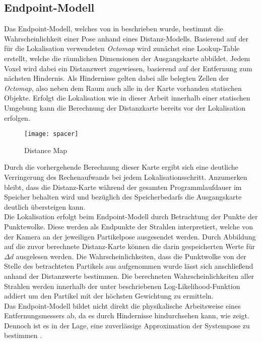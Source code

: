 
\subsection{Endpoint-Modell}
Das Endpoint-Modell, welches von \red[X] in \cite{Endpoint} beschrieben wurde, bestimmt die Wahrscheinlichkeit einer Pose anhand eines Distanz-Modells. Basierend auf der für die Lokalisation verwendeten \textit{Octomap} wird zunächst eine Lookup-Table erstellt, welche die räumlichen Dimensionen der Ausgangskarte abbildet. Jedem Voxel wird dabei ein Distanzwert zugewiesen, basierend auf der Entfernung zum nächsten Hindernis. Als Hindernisse gelten dabei alle belegten Zellen der \textit{Octomap}, also neben dem Raum auch alle in der Karte vorhanden statischen Objekte. Erfolgt die Lokalisation wie in dieser Arbeit innerhalb einer statischen Umgebung kann die Berechnung der Distanzkarte bereits vor der Lokalisation erfolgen.\\

\begin{figure}[!ht]
	\begin{center}
		\texttt{[image: spacer]}
		\caption{Distance Map}
		\label{fig.dist_map}
	\end{center}
\end{figure}

Durch die vorhergehende Berechnung dieser Karte ergibt sich eine deutliche Verringerung des Rechenaufwands bei jedem Lokalisationsschritt. Anzumerken bleibt, dass die Distanz-Karte während der gesamten Programmlaufdauer im Speicher behalten wird und bezüglich des Speicherbedarfs die Ausgangskarte deutlich übersteigen kann.\\
Die Lokalisation erfolgt beim Endpoint-Modell durch Betrachtung der Punkte der Punktewolke. Diese werden als Endpunkte der Strahlen interpretiert, welche von der Kamera an der jeweiligen Partikelpose ausgesendet werden. Durch Abbildung auf die zuvor berechnete Distanz-Karte können die darin gespeicherten Werte für $\Delta d$ ausgelesen werden. Die Wahrscheinlichkeiten, dass die Punktwolke von der Stelle des betrachteten Partikels aus aufgenommen wurde lässt sich anschließend anhand der Distanzwerte bestimmen. Die berechneten Wahrscheinlichkeiten aller Strahlen werden innerhalb der unter  beschriebenen Log-Likelihood-Funktion addiert um den Partikel mit der höchsten Gewichtung zu ermitteln.\\
Das Endpoint-Modell bildet nicht direkt die physikalische Arbeitsweise eines Entfernungsmessers ab, da es durch Hindernisse \glqq hindurchsehen\grqq{} kann, wie  zeigt. Dennoch ist es in der Lage, eine zuverlässige Approximation der Systempose zu bestimmen \cite{Konolige1999}.\\

